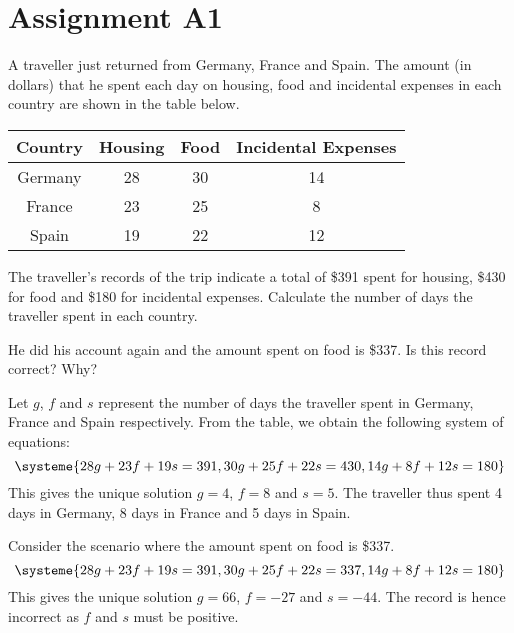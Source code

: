 \section{Assignment A1}

\begin{problem}
    A traveller just returned from Germany, France and Spain. The amount (in dollars) that he spent each day on housing, food and incidental expenses in each country are shown in the table below.
    \begin{table}[H]
        \centering
        \begin{tabular}{|c|c|c|c|}
        \hline
        \textbf{Country} & \textbf{Housing} & \textbf{Food} & \textbf{Incidental Expenses}  \\\hline
        Germany & 28      & 30   & 14                   \\\hline
        France  & 23      & 25   & 8                    \\\hline
        Spain   & 19      & 22   & 12 \\\hline                  
        \end{tabular}
    \end{table}
    The traveller's records of the trip indicate a total of \$391 spent for housing, \$430 for food and \$180 for incidental expenses. Calculate the number of days the traveller spent in each country.

    He did his account again and the amount spent on food is \$337. Is this record correct? Why?
\end{problem}
\begin{solution}
    Let $g$, $f$ and $s$ represent the number of days the traveller spent in Germany, France and Spain respectively. From the table, we obtain the following system of equations: \[\systeme{28g + 23f + 19s = 391,30g + 25f + 22s = 430,14g + 8f + 12s = 180}\] This gives the unique solution $g=4$, $f=8$ and $s=5$. The traveller thus spent 4 days in Germany, 8 days in France and 5 days in Spain. 

    Consider the scenario where the amount spent on food is \$337. \[\systeme{28g + 23f + 19s = 391,30g + 25f + 22s = 337,14g + 8f + 12s = 180}\] This gives the unique solution $g=66$, $f=-27$ and $s=-44$. The record is hence incorrect as $f$ and $s$ must be positive.
\end{solution}

